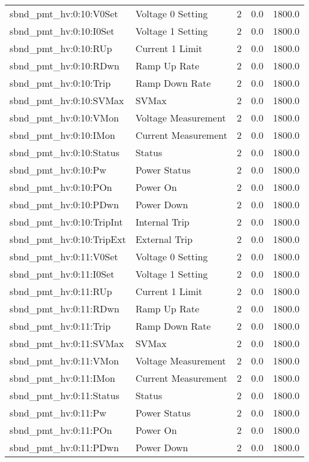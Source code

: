 \begin{center}
\begin{longtable}{l | l l l l }
sbnd\_pmt\_hv:0:10:V0Set & Voltage 0 Setting & 2 & 0.0 & 1800.0\\ 
sbnd\_pmt\_hv:0:10:I0Set & Voltage 1 Setting & 2 & 0.0 & 1800.0\\ 
sbnd\_pmt\_hv:0:10:RUp & Current 1 Limit & 2 & 0.0 & 1800.0\\ 
sbnd\_pmt\_hv:0:10:RDwn & Ramp Up Rate & 2 & 0.0 & 1800.0\\ 
sbnd\_pmt\_hv:0:10:Trip & Ramp Down Rate & 2 & 0.0 & 1800.0\\ 
sbnd\_pmt\_hv:0:10:SVMax & SVMax & 2 & 0.0 & 1800.0\\ 
sbnd\_pmt\_hv:0:10:VMon & Voltage Measurement & 2 & 0.0 & 1800.0\\ 
sbnd\_pmt\_hv:0:10:IMon & Current Measurement & 2 & 0.0 & 1800.0\\ 
sbnd\_pmt\_hv:0:10:Status & Status & 2 & 0.0 & 1800.0\\ 
sbnd\_pmt\_hv:0:10:Pw & Power Status & 2 & 0.0 & 1800.0\\ 
sbnd\_pmt\_hv:0:10:POn & Power On & 2 & 0.0 & 1800.0\\ 
sbnd\_pmt\_hv:0:10:PDwn & Power Down & 2 & 0.0 & 1800.0\\ 
sbnd\_pmt\_hv:0:10:TripInt & Internal Trip & 2 & 0.0 & 1800.0\\ 
sbnd\_pmt\_hv:0:10:TripExt & External Trip & 2 & 0.0 & 1800.0\\ 
sbnd\_pmt\_hv:0:11:V0Set & Voltage 0 Setting & 2 & 0.0 & 1800.0\\ 
sbnd\_pmt\_hv:0:11:I0Set & Voltage 1 Setting & 2 & 0.0 & 1800.0\\ 
sbnd\_pmt\_hv:0:11:RUp & Current 1 Limit & 2 & 0.0 & 1800.0\\ 
sbnd\_pmt\_hv:0:11:RDwn & Ramp Up Rate & 2 & 0.0 & 1800.0\\ 
sbnd\_pmt\_hv:0:11:Trip & Ramp Down Rate & 2 & 0.0 & 1800.0\\ 
sbnd\_pmt\_hv:0:11:SVMax & SVMax & 2 & 0.0 & 1800.0\\ 
sbnd\_pmt\_hv:0:11:VMon & Voltage Measurement & 2 & 0.0 & 1800.0\\ 
sbnd\_pmt\_hv:0:11:IMon & Current Measurement & 2 & 0.0 & 1800.0\\ 
sbnd\_pmt\_hv:0:11:Status & Status & 2 & 0.0 & 1800.0\\ 
sbnd\_pmt\_hv:0:11:Pw & Power Status & 2 & 0.0 & 1800.0\\ 
sbnd\_pmt\_hv:0:11:POn & Power On & 2 & 0.0 & 1800.0\\ 
sbnd\_pmt\_hv:0:11:PDwn & Power Down & 2 & 0.0 & 1800.0\\ 

\end{longtable}
\end{center}
